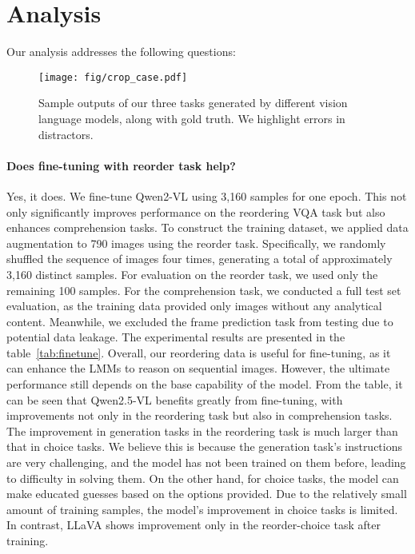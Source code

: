 \section{Analysis}
Our analysis addresses the following questions:
\begin{figure*}[t]
\centering
\texttt{[image: fig/crop\_case.pdf]}
\caption{Sample outputs of our three tasks generated by different vision language models, along with gold truth. We highlight errors in distractors. }
\label{fig:case}
\vspace{-4mm}
\end{figure*}

\paragraph{Does fine-tuning with reorder task help?}
Yes, it does. We fine-tune Qwen2-VL using 3,160 samples for one epoch. This not only significantly improves performance on the reordering VQA task but also enhances comprehension tasks.
To construct the training dataset, we applied data augmentation to 790 images using the reorder task. Specifically, we randomly shuffled the sequence of images four times, generating a total of approximately 3,160 distinct samples. For evaluation on the reorder task, we used only the remaining 100 samples. For the comprehension task, we conducted a full test set evaluation, as the training data provided only images without any analytical content. Meanwhile, we excluded the frame prediction task from testing due to potential data leakage. The experimental results are presented in the table~\ref{tab:finetune}. 
Overall, our reordering data is useful for fine-tuning, as it can enhance the LMMs to reason on sequential images. However, the ultimate performance still depends on the base capability of the model. From the table, it can be seen that Qwen2.5-VL benefits greatly from fine-tuning, with improvements not only in the reordering task but also in comprehension tasks. The improvement in generation tasks in the reordering task is much larger than that in choice tasks. We believe this is because the generation task's instructions are very challenging, and the model has not been trained on them before, leading to difficulty in solving them. On the other hand, for choice tasks, the model can make educated guesses based on the options provided. Due to the relatively small amount of training samples, the model's improvement in choice tasks is limited. In contrast, LLaVA shows improvement only in the reorder-choice task after training.


